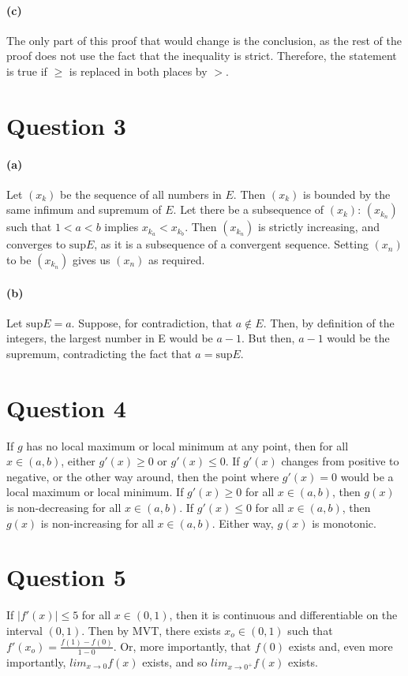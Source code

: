 \documentclass[10pt,letter]{article}
\begin{document}
\paragraph{(c)} The only part of this proof that would change is the conclusion, as the rest of the proof does not use the fact that the inequality is strict. Therefore, the statement is true if $\geq$ is replaced in both places by $>$. 


\section*{Question 3}
\paragraph{(a)} Let $(x_k)$ be the sequence of all numbers in $E$. Then $(x_k)$ is bounded by the same infimum and supremum of $E$. Let there be a subsequence of $(x_k)$: $(x_{k_n})$ such that $1<a<b$ implies $x_{k_a}<x_{k_b}$. Then $(x_{k_n})$ is strictly increasing, and converges to $\text{sup}E$, as it is a subsequence of a convergent sequence. Setting $(x_n)$ to be $(x_{k_n})$ gives us $(x_n)$ as required.  

\paragraph{(b)} Let $\text{sup} E = a$. Suppose, for contradiction, that $a\notin E$. Then, by definition of the integers, the largest number in E would be $a-1$. But then, $a-1$ would be the supremum, contradicting the fact that $a=\text{sup}E$. 


\section*{Question 4} 
If $g$ has no local maximum or local minimum at any point, then for all $x\in(a,b)$, either $g'(x)\geq0$ or $g'(x)\leq0$. If $g'(x)$ changes from positive to negative, or the other way around, then the point where $g'(x)=0$ would be a local maximum or local minimum. If $g'(x)\geq0$ for all $x\in(a,b)$, then $g(x)$ is non-decreasing for all $x\in(a,b)$. If $g'(x)\leq0$ for all $x\in(a,b)$, then $g(x)$ is non-increasing for all $x\in(a,b)$. Either way, $g(x)$ is monotonic. 


\section*{Question 5}
If $|f'(x)|\leq5$ for all $x\in(0,1)$, then it is continuous and differentiable on the interval $(0,1)$. Then by MVT, there exists $x_o \in (0,1)$ such that $f'(x_o)=\frac{f(1)-f(0)}{1-0}$. Or, more importantly, that $f(0)$ exists and, even more importantly, $lim_{x\rightarrow0}f(x)$ exists, and so $lim_{x\rightarrow0^+}f(x)$ exists. 
\end{document}
